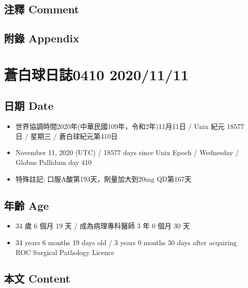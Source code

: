 \documentclass[a5paper, 11pt
]{book}
\providecommand{\tightlist}{%
  \setlength{\itemsep}{0pt}\setlength{\parskip}{0pt}}
\begin{document}
\hypertarget{ux6ce8ux91cb-comment-65}{%
\subsection{注釋 Comment}\label{ux6ce8ux91cb-comment-65}}

\hypertarget{ux9644ux9304-appendix-65}{%
\subsection{附錄 Appendix}\label{ux9644ux9304-appendix-65}}

\hypertarget{ux84bcux767dux7403ux65e5ux8a8c0410-20201111}{%
\section{蒼白球日誌0410
2020/11/11}\label{ux84bcux767dux7403ux65e5ux8a8c0410-20201111}}

\hypertarget{ux65e5ux671f-date-66}{%
\subsection{日期 Date}\label{ux65e5ux671f-date-66}}

\begin{itemize}
\tightlist
\item
  世界協調時間2020年(中華民國109年，令和2年)11月11日 / Unix 紀元 18577
  日 / 星期三 / 蒼白球紀元第410日
\item
  November 11, 2020 (UTC) / 18577 days since Unix Epoch / Wednesday /
  Globus Pallidum day 410
\item
  特殊註記: 口服A酸第193天，劑量加大到20mg QD第167天
\end{itemize}

\hypertarget{ux5e74ux9f61-age-66}{%
\subsection{年齡 Age}\label{ux5e74ux9f61-age-66}}

\begin{itemize}
\tightlist
\item
  34 歲 6 個月 19 天 / 成為病理專科醫師 3 年 0 個月 30 天
\item
  34 years 6 months 19 days old / 3 years 0 months 30 days after
  acquiring ROC Surgical Pathology Licence
\end{itemize}

\hypertarget{ux672cux6587-content-66}{%
\subsection{本文 Content}\label{ux672cux6587-content-66}}
\end{document}
